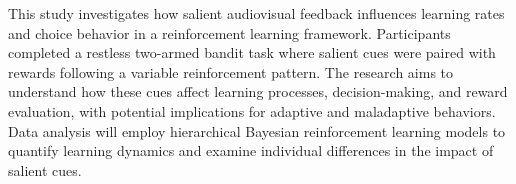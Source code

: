 This study investigates how salient audiovisual feedback influences learning rates and choice behavior in a reinforcement learning framework. Participants completed a restless two-armed bandit task where salient cues were paired with rewards following a variable reinforcement pattern. The research aims to understand how these cues affect learning processes, decision-making, and reward evaluation, with potential implications for adaptive and maladaptive behaviors. Data analysis will employ hierarchical Bayesian reinforcement learning models to quantify learning dynamics and examine individual differences in the impact of salient cues. 